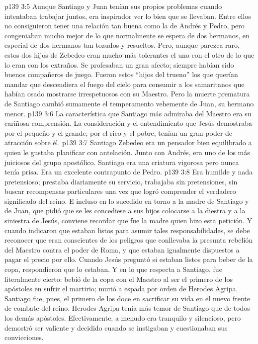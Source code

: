 \vs p139 3:5 Aunque Santiago y Juan tenían sus propios problemas cuando intentaban trabajar juntos, era inspirador ver lo bien que se llevaban. Entre ellos no consiguieron tener una relación tan buena como la de Andrés y Pedro, pero congeniaban mucho mejor de lo que normalmente se espera de dos hermanos, en especial de dos hermanos tan tozudos y resueltos. Pero, aunque parezca raro, estos dos hijos de Zebedeo eran mucho más tolerantes el uno con el otro de lo que lo eran con los extraños. Se profesaban un gran afecto; siempre habían sido buenos compañeros de juego. Fueron estos “hijos del trueno” los que querían mandar que descendiera el fuego del cielo para consumir a los samaritanos que habían osado mostrarse irrespetuosos con su Maestro. Pero la muerte prematura de Santiago cambió sumamente el temperamento vehemente de Juan, su hermano menor.
\vs p139 3:6 \pc La característica que Santiago más admiraba del Maestro era su cariñosa comprensión. La consideración y el entendimiento que Jesús demostraba por el pequeño y el grande, por el rico y el pobre, tenían un gran poder de atracción sobre él.
\vs p139 3:7 \pc Santiago Zebedeo era un pensador bien equilibrado a quien le gustaba planificar con antelación. Junto con Andrés, era uno de los más juiciosos del grupo apostólico. Santiago era una criatura vigorosa pero nunca tenía prisa. Era un excelente contrapunto de Pedro.
\vs p139 3:8 Era humilde y nada pretensioso; prestaba diariamente su servicio, trabajaba sin pretensiones, sin buscar recompensas particulares una vez que logró comprender el verdadero significado del reino. E incluso en lo sucedido en torno a la madre de Santiago y de Juan, que pidió que se les concediese a sus hijos colocarse a la diestra y a la siniestra de Jesús, conviene recordar que fue la madre quien hizo esta petición. Y cuando indicaron que estaban listos para asumir tales responsabilidades, se debe reconocer que eran conscientes de los peligros que conllevaba la presunta rebelión del Maestro contra el poder de Roma, y que estaban igualmente dispuestos a pagar el precio por ello. Cuando Jesús preguntó si estaban listos para beber de la copa, respondieron que lo estaban. Y en lo que respecta a Santiago, fue literalmente cierto: bebió de la copa con el Maestro al ser el primero de los apóstoles en sufrir el martirio; murió a espada por orden de Herodes Agripa. Santiago fue, pues, el primero de los doce en sacrificar su vida en el nuevo frente de combate del reino. Herodes Agripa tenía más temor de Santiago que de todos los demás apóstoles. Efectivamente, a menudo era tranquilo y silencioso, pero demostró ser valiente y decidido cuando se instigaban y cuestionaban sus convicciones.
